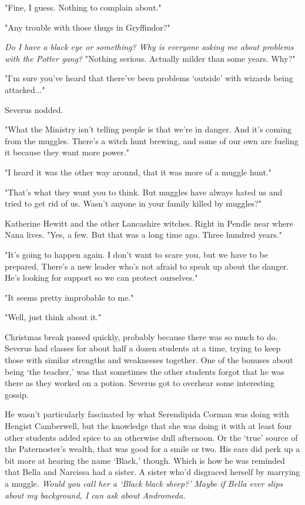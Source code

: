 "Fine, I guess. Nothing to complain about."

"Any trouble with those thugs in Gryffindor?"

\emph{Do I have a black eye or something? Why is everyone asking me about problems with the Potter gang?} "Nothing serious. Actually milder than some years. Why?"

"I'm sure you've heard that there've been problems `outside' with wizards being attacked..."

Severus nodded.

"What the Ministry isn't telling people is that we're in danger. And it's coming from the muggles. There's a witch hunt brewing, and some of our own are fueling it because they want more power."

"I heard it was the other way around, that it was more of a muggle hunt."

"That's what they want you to think. But muggles have always hated us and tried to get rid of us. Wasn't anyone in your family killed by muggles?"

Katherine Hewitt and the other Lancashire witches. Right in Pendle near where Nana lives. "Yes, a few. But that was a long time ago. Three hundred years."

"It's going to happen again. I don't want to scare you, but we have to be prepared. There's a new leader who's not afraid to speak up about the danger. He's looking for support so we can protect ourselves."

"It seems pretty improbable to me."

"Well, just think about it."

Christmas break passed quickly, probably because there was so much to do. Severus had classes for about half a dozen students at a time, trying to keep those with similar strengths and weaknesses together. One of the bonuses about being `the teacher,' was that sometimes the other students forgot that he was there as they worked on a potion. Severus got to overhear some interesting gossip.

He wasn't particularly fascinated by what Serendipida Corman was doing with Hengist Camberwell, but the knowledge that she was doing it with at least four other students added spice to an otherwise dull afternoon. Or the `true' source of the Paternoster's wealth, that was good for a smile or two. His ears did perk up a bit more at hearing the name `Black,' though. Which is how he was reminded that Bella and Narcissa had a sister. A sister who'd disgraced herself by marrying a muggle. \emph{Would you call her a `Black black sheep?' Maybe if Bella ever slips about my background, I can ask about Andromeda.}

